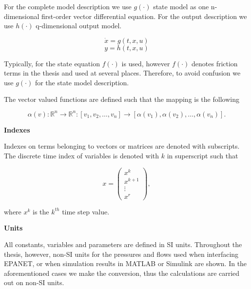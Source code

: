 \vspace{-2mm}
For the complete model description we use $g(\cdot)$ state model as one n-dimensional first-order vector differential equation. For the output description we use $h(\cdot)$ q-dimensional output model. 

\vspace{-6mm}
\begin{equation*}
\dot{x} = g(t,x,u)
\end{equation*}
\vspace{-8mm}
\begin{equation*}
y = h(t,x,u)
\end{equation*}
\vspace{-6mm}

Typically, for the state equation $f(\cdot)$ is used, however $f(\cdot)$ denotes friction terms in the thesis and used at several places. Therefore, to avoid confusion we use $g(\cdot)$ for the state model description.

The vector valued functions are defined such that the mapping is the following

\vspace{-4mm}
 \begin{equation*}
 \alpha(v) : {\mathbb{R}}^{n} \rightarrow {\mathbb{R}}^{n} : [v_1, v_2, \hdots, v_n] \rightarrow [\alpha(v_1), \alpha(v_2),\hdots,\alpha(v_n)].
 \end{equation*}

 \textbf{Indexes}

 Indexes on terms belonging to vectors or matrices are denoted with subscripts. The discrete time index of variables is denoted with $k$ in superscript such that 

\vspace{-6mm}
\begin{equation*}
 x = 
 \begin{pmatrix}

 		 x^k 	\\
		 x^{k+1} 	\\
 		 \vdots \\
		 x^r

 \end{pmatrix},
 \end{equation*}
 \vspace{-6mm}

 where $x^k$ is the $k^{th}$ time step value. 

 \textbf{Units}

 All constants, variables and parameters are defined in SI units. Throughout the thesis, however, non-SI units for the pressures and flows used when interfacing EPANET, or when simulation results in MATLAB or Simulink are shown. In the aforementioned cases we make the conversion, thus the calculations are carried out on non-SI units. 

